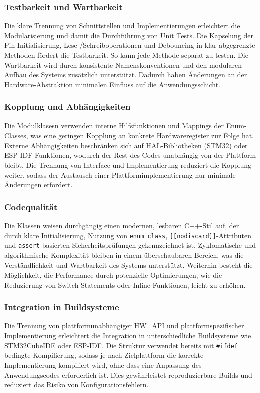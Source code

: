 \subsubsection{Testbarkeit und Wartbarkeit}
Die klare Trennung von Schnittstellen und Implementierungen erleichtert die Modularisierung und damit die Durchführung von Unit Tests.
Die Kapselung der Pin-Initialisierung, Lese-/Schreiboperationen und Debouncing in klar abgegrenzte Methoden fördert die Testbarkeit. 
So kann jede Methode separat zu testen. 
Die Wartbarkeit wird durch konsistente Namenskonventionen und den modularen Aufbau des Systems zusätzlich unterstützt. 
Dadurch haben Änderungen an der Hardware-Abstraktion minimalen Einfluss auf die Anwendungsschicht.

\subsubsection{Kopplung und Abhängigkeiten}
Die Modulklasesn verwenden interne Hilfsfunktionen und Mappings der Enum-Classes, was eine geringen Kopplung an konkrete Hardwareregister zur Folge hat. 
Externe Abhängigkeiten beschränken sich auf HAL-Bibliotheken (STM32) oder ESP-IDF-Funktionen, wodurch der Rest des Codes unabhängig von der Plattform bleibt. 
Die Trennung von Interface und Implementierung reduziert die Kopplung weiter, sodass der Austausch einer Plattformimplementierung nur minimale Änderungen erfordert.

\subsubsection{Codequalität}
Die Klassen weisen durchgängig einen modernen, lesbaren C++-Stil auf, der durch klare Initialisierung, Nutzung von \texttt{enum class}, \texttt{[[nodiscard]]}-Attributen und \texttt{assert}-basierten Sicherheitsprüfungen gekennzeichnet ist. 
Zyklomatische und algorithmische Komplexität bleiben in einem überschaubaren Bereich, was die Verständlichkeit und Wartbarkeit des Systems unterstützt.
Weiterhin besteht die Möglichkeit, die Performance durch potenzielle Optimierungen, wie die Reduzierung von Switch-Statements oder Inline-Funktionen, leicht zu erhöhen.

\subsubsection{Integration in Buildsysteme}
Die Trennung von plattformunabhängiger HW\_API und plattformspezifischer Implementierung erleichtert die Integration in unterschiedliche Buildsysteme wie STM32CubeIDE oder ESP-IDF. 
Die Struktur verwendet bereits mit \texttt{\#ifdef} bedingte Kompilierung, sodass je nach Zielplattform die korrekte Implementierung kompiliert wird, ohne dass eine Anpassung des Anwendungscodes erforderlich ist. 
Dies gewährleistet reproduzierbare Builds und reduziert das Risiko von Konfigurationsfehlern.

